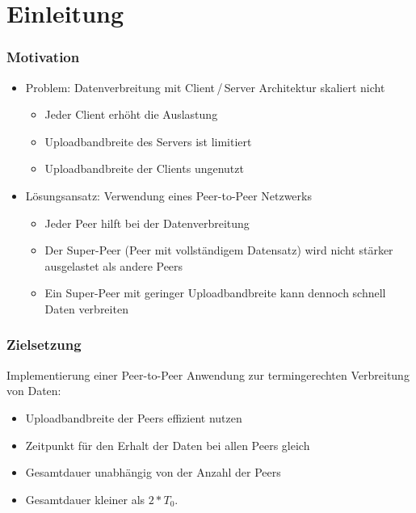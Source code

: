 \section{Einleitung}

\begin{frame}
  \frametitle{Motivation}  
  \begin{itemize}
    \item Problem: Datenverbreitung mit Client\,/\,Server Architektur skaliert nicht
    \vspace{1mm}
    \begin{itemize}
      \item Jeder Client erhöht die Auslastung
      \item Uploadbandbreite des Servers ist limitiert        
      \item Uploadbandbreite der Clients ungenutzt
    \end{itemize}

    \vspace{2mm}

    \item Lösungsansatz: Verwendung eines Peer-to-Peer Netzwerks
    \vspace{1mm}
    \begin{itemize}
      \item Jeder Peer hilft bei der Datenverbreitung
      \item Der Super-Peer (Peer mit vollständigem Datensatz) wird nicht stärker ausgelastet als andere Peers
      \item Ein Super-Peer mit geringer Uploadbandbreite kann dennoch schnell Daten verbreiten
    \end{itemize}    
  \end{itemize}
\end{frame}


\begin{frame}
  \frametitle{Zielsetzung}
    Implementierung einer Peer-to-Peer Anwendung zur termingerechten Verbreitung von Daten:
    \vspace{1mm}
    \begin{itemize}
      \item Uploadbandbreite der Peers effizient nutzen
      \item Zeitpunkt für den Erhalt der Daten bei allen Peers gleich
      \item Gesamtdauer unabhängig von der Anzahl der Peers
      \item Gesamtdauer kleiner als $2 * T_0$.
    \end{itemize}
\end{frame}